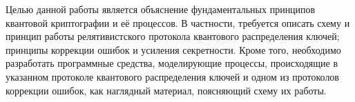 Целью данной работы является объяснение фундаментальных принципов квантовой криптографии и её процессов. 
В частности, требуется описать схему и принцип работы релятивистского протокола квантового распределения ключей; принципы коррекции ошибок и усиления секретности.
Кроме того, необходимо разработать программные средства, моделирующие процессы, происходящие в указанном протоколе квантового распределения ключей и одном из протоколов коррекции ошибок, как наглядный материал, поясняющий схему их работы.


\clearpage